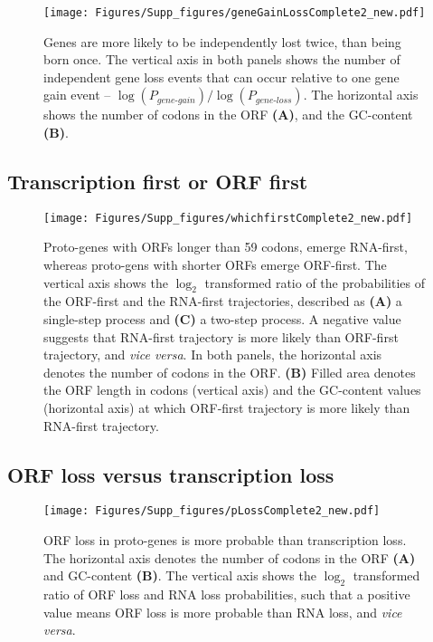 \documentclass[12pt,a4paper]{article}
\begin{document}
\begin{figure}[H]
\centering
\texttt{[image: Figures/Supp\_figures/geneGainLossComplete2\_new.pdf]}
\caption{Genes are more likely to be independently lost twice, than being born once. The vertical axis in both panels shows the number of independent gene loss events that can occur relative to one gene gain event -- $\log(P_\textit{gene-gain})/\log(P_\textit{gene-loss})$. The horizontal axis shows the number of codons in the ORF \textbf{(A)}, and the GC-content \textbf{(B)}.}
\end{figure}

\subsection{Transcription first or ORF first}

\begin{figure}[H]
\centering
\texttt{[image: Figures/Supp\_figures/whichfirstComplete2\_new.pdf]}
\caption{Proto-genes with ORFs longer than 59 codons, emerge RNA-first, whereas proto-gens with shorter ORFs emerge ORF-first. The vertical axis shows the $\log_2$ transformed ratio of the probabilities of the ORF-first and the RNA-first trajectories, described as \textbf{(A)} a single-step process and \textbf{(C)} a two-step process. A negative value suggests that RNA-first trajectory is more likely than ORF-first trajectory, and \textit{vice versa}. In both panels, the horizontal axis denotes the number of codons in the ORF. \textbf{(B)} Filled area denotes the ORF length in codons (vertical axis) and the GC-content values (horizontal axis) at which ORF-first trajectory is more likely than RNA-first trajectory.}
\end{figure}

\subsection{ORF loss versus transcription loss}

\begin{figure}[H]
\centering
\texttt{[image: Figures/Supp\_figures/pLossComplete2\_new.pdf]}
\caption{ORF loss in proto-genes is more probable than transcription loss. The horizontal axis denotes the number of codons in the ORF \textbf{(A)} and GC-content \textbf{(B)}. The vertical axis shows the $\log_2$ transformed ratio of ORF loss and RNA loss probabilities, such that a positive value means ORF loss is more probable than RNA loss, and \textit{vice versa}.}
\end{figure}
\end{document}
